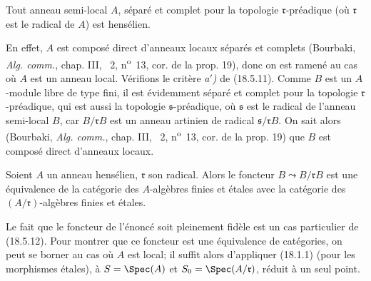 \begin{proposition}[18.5.14]
\label{IV.18.5.14}
Tout anneau semi-local $A$, séparé et complet pour la topologie $\mathfrak r$-préadique \textup{(}où $\mathfrak r$ est le radical de $A$\textup{)} est hensélien.
\end{proposition}

En effet, $A$ est composé direct d'anneaux locaux séparés et complets (Bourbaki, \emph{Alg. comm.}, chap. III, \textsection~2, n\textsuperscript{o}~13, cor. de la prop. 19), donc on est ramené au cas où $A$ est un anneau local. Vérifions le critère \emph{a$'$)} de (18.5.11). Comme $B$ est un $A$-module libre de type fini, il est évidemment séparé et complet pour la topologie $\mathfrak r$-préadique,
qui est aussi la topologie $\mathfrak s$-préadique, où $\mathfrak s$ est le radical de l'anneau semi-local $B$, car $B/\mathfrak rB$ est un anneau artinien de radical $\mathfrak s/\mathfrak rB$. On sait alors (Bourbaki, \emph{Alg. comm.}, chap. III, \textsection~2, n\textsuperscript{o}~13, cor. de la prop. 19) que $B$ est composé direct d'anneaux locaux.

\begin{proposition}[18.5.15]
\label{IV.18.5.15}
Soient $A$ un anneau hensélien, $\mathfrak r$ son radical. Alors le foncteur $B\leadsto B/\mathfrak rB$ est une équivalence de la catégorie des $A$-algèbres finies et étales avec la catégorie des $(A/\mathfrak r)$-algèbres finies et étales.
\end{proposition}

Le fait que le foncteur de l'énoncé soit pleinement fidèle est un cas particulier de (18.5.12). Pour montrer que ce foncteur est une équivalence de catégories, on peut se borner au cas où $A$ est local; il suffit alors d'appliquer (18.1.1) (pour les morphismes étales), à $S=\Spec(A)$ et $S_0=\Spec(A/\mathfrak r)$, réduit à un seul point.

